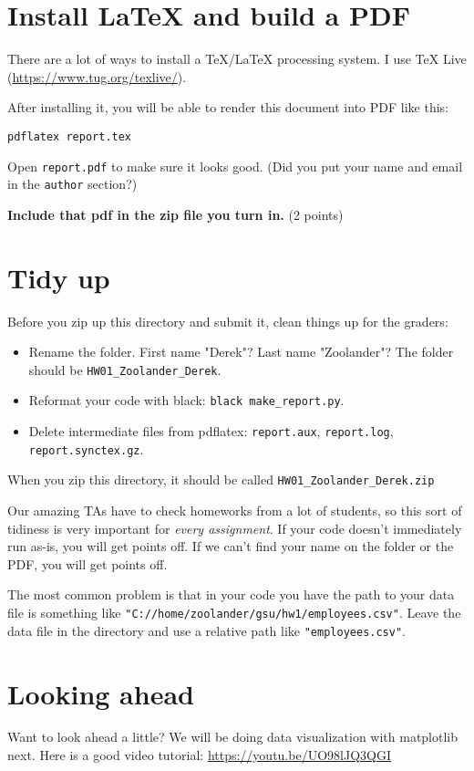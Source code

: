 \documentclass[11pt,english]{article}
\begin{document}
\section{Install LaTeX and build a PDF}

There are a lot of ways to install a TeX/LaTeX processing system.  I use TeX Live (\url{https://www.tug.org/texlive/}).

After installing it, you will be able to render this document into PDF like this:

\begin{Verbatim}
pdflatex report.tex
\end{Verbatim}

Open \texttt{report.pdf} to make sure it looks good. (Did you put your name and email in the \texttt{author} section?)

\textbf{Include that pdf in the zip file you turn in.} (2 points)

\section{Tidy up}

Before you zip up this directory and submit it, clean things up for the graders:

\begin{itemize}
\item Rename the folder.  First name "Derek"? Last name "Zoolander"? The folder should be \texttt{HW01\_Zoolander\_Derek}.
\item Reformat your code with black: \texttt{black make\_report.py}.
\item Delete intermediate files from pdflatex: \texttt{report.aux},  \texttt{report.log},  \texttt{report.synctex.gz}.
\end{itemize}

When you zip this directory, it should be called \texttt{HW01\_Zoolander\_Derek.zip}

Our amazing TAs have to check homeworks from a lot of students, so this sort of tidiness is very important for \emph{every assignment}.  If your
 code doesn't immediately run as-is,  you will get points off.  If we can't find your name on the folder or the PDF, you will get points off.

The most common problem is that in your code you have the path to your data file is something like \texttt{"C://home/zoolander/gsu/hw1/employees.csv"}.
Leave the data file in the directory and use a relative path like \texttt{"employees.csv"}.

\section{Looking ahead}

Want to look ahead a little?  We will be doing data visualization with matplotlib next.  Here is a good video tutorial:
\url{https://youtu.be/UO98lJQ3QGI}
\end{document}
